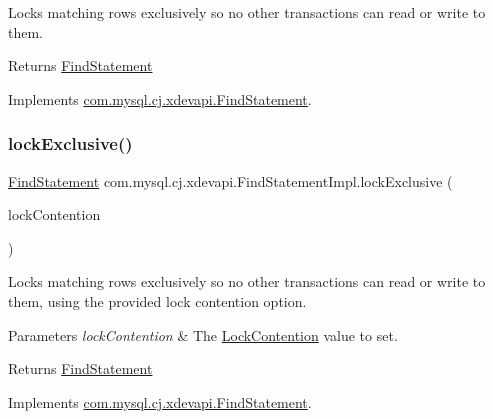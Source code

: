 Locks matching rows exclusively so no other transactions can read or write to them.

\begin{DoxyReturn}{Returns}
\mbox{\hyperlink{interfacecom_1_1mysql_1_1cj_1_1xdevapi_1_1_find_statement}{Find\+Statement}} 
\end{DoxyReturn}


Implements \mbox{\hyperlink{interfacecom_1_1mysql_1_1cj_1_1xdevapi_1_1_find_statement_af7d8cbf89d9c5c6caf6c0d89490b5d06}{com.\+mysql.\+cj.\+xdevapi.\+Find\+Statement}}.

\mbox{\label{classcom_1_1mysql_1_1cj_1_1xdevapi_1_1_find_statement_impl_abb488a09f4ad595edcb2725712182e38}} 
\subsubsection{\texorpdfstring{lock\+Exclusive()}{lockExclusive()}\hspace{0.1cm}{\footnotesize\ttfamily [2/2]}}
{\footnotesize\ttfamily \mbox{\hyperlink{interfacecom_1_1mysql_1_1cj_1_1xdevapi_1_1_find_statement}{Find\+Statement}} com.\+mysql.\+cj.\+xdevapi.\+Find\+Statement\+Impl.\+lock\+Exclusive (\begin{DoxyParamCaption}\item[{Lock\+Contention}]{lock\+Contention }\end{DoxyParamCaption})}

Locks matching rows exclusively so no other transactions can read or write to them, using the provided lock contention option.


\begin{DoxyParams}{Parameters}
{\em lock\+Contention} & The \mbox{\hyperlink{}{Lock\+Contention}} value to set. \\
\hline
\end{DoxyParams}
\begin{DoxyReturn}{Returns}
\mbox{\hyperlink{interfacecom_1_1mysql_1_1cj_1_1xdevapi_1_1_find_statement}{Find\+Statement}} 
\end{DoxyReturn}


Implements \mbox{\hyperlink{interfacecom_1_1mysql_1_1cj_1_1xdevapi_1_1_find_statement_a45a87d77da29808cb82617f003de584d}{com.\+mysql.\+cj.\+xdevapi.\+Find\+Statement}}.

